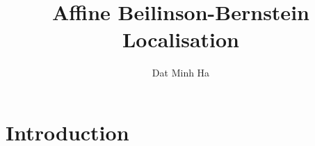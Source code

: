 

\setcounter{section}{-1}





    \title{Affine Beilinson-Bernstein Localisation}
    
    \author{Dat Minh Ha}
    \maketitle
    
    \begin{abstract}
    
    \end{abstract}
    
    {
    \hypersetup{} 
    \tableofcontents %
    }

    \section{Introduction}

    

    
    
    \printbibliography

